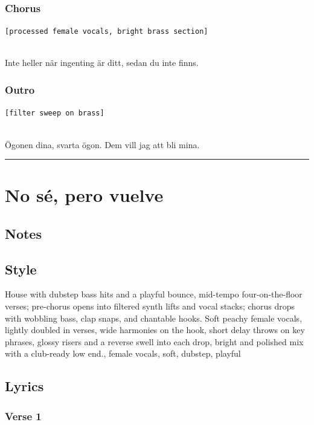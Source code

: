 \documentclass[]{article}
\begin{document}
\subsubsection{Chorus}\label{chorus-37}

\texttt{{[}processed\ female\ vocals,\ bright\ brass\ section{]}}\strut \\
Inte heller när ingenting är ditt, sedan du inte finns.

\subsubsection{Outro}\label{outro-7}

\texttt{{[}filter\ sweep\ on\ brass{]}}\strut \\
Ögonen dina, svarta ögon. Dem vill jag att bli mina.

\begin{center}\rule{0.5\linewidth}{0.5pt}\end{center}

\section{No sé, pero vuelve}\label{no-suxe9-pero-vuelve}

\subsection{Notes}\label{notes-23}

\subsection{Style}\label{style-23}

House with dubstep bass hits and a playful bounce, mid-tempo
four-on-the-floor verses; pre-chorus opens into filtered synth lifts and
vocal stacks; chorus drops with wobbling bass, clap snaps, and chantable
hooks. Soft peachy female vocals, lightly doubled in verses, wide
harmonies on the hook, short delay throws on key phrases, glossy risers
and a reverse swell into each drop, bright and polished mix with a
club-ready low end., female vocals, soft, dubstep, playful

\subsection{Lyrics}\label{lyrics-23}

\subsubsection{Verse 1}\label{verse-1-14}
\end{document}
